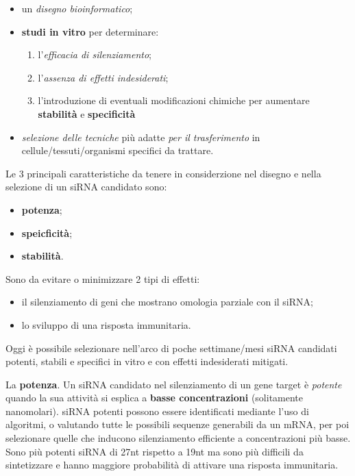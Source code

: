 \documentclass[]{article}
\begin{document}
\begin{itemize}
\itemsep1pt\parskip0pt
\item
  un \emph{disegno bioinformatico};
\item
  \textbf{studi in vitro} per determinare:

  \begin{enumerate}
  \def\labelenumi{\arabic{enumi}.}
  \itemsep1pt\parskip0pt
  \item
    l'\emph{efficacia di silenziamento};
  \item
    l'\emph{assenza di effetti indesiderati};
  \item
    l'introduzione di eventuali modificazioni chimiche per aumentare
    \textbf{stabilità} e \textbf{specificità}
  \end{enumerate}
\item
  \emph{selezione delle tecniche} più adatte \emph{per il trasferimento}
  in cellule/tessuti/organismi specifici da trattare.
\end{itemize}

Le 3 principali caratteristiche da tenere in considerzione nel disegno e
nella selezione di un siRNA candidato sono:

\begin{itemize}
\itemsep1pt\parskip0pt
\item
  \textbf{potenza};
\item
  \textbf{speicficità};
\item
  \textbf{stabilità}.
\end{itemize}

Sono da evitare o minimizzare 2 tipi di effetti:

\begin{itemize}
\itemsep1pt\parskip0pt
\item
  il silenziamento di geni che mostrano omologia parziale con il siRNA;
\item
  lo sviluppo di una risposta immunitaria.
\end{itemize}

Oggi è possibile selezionare nell'arco di poche settimane/mesi siRNA
candidati potenti, stabili e specifici in vitro e con effetti
indesiderati mitigati.

La \textbf{potenza}. Un siRNA candidato nel silenziamento di un gene
target è \emph{potente} quando la sua attività si esplica a
\textbf{basse concentrazioni} (solitamente nanomolari). siRNA potenti
possono essere identificati mediante l'uso di algoritmi, o valutando
tutte le possibili sequenze generabili da un mRNA, per poi selezionare
quelle che inducono silenziamento efficiente a concentrazioni più basse.
Sono più potenti siRNA di 27nt rispetto a 19nt ma sono più difficili da
sintetizzare e hanno maggiore probabilità di attivare una risposta
immunitaria.
\end{document}
